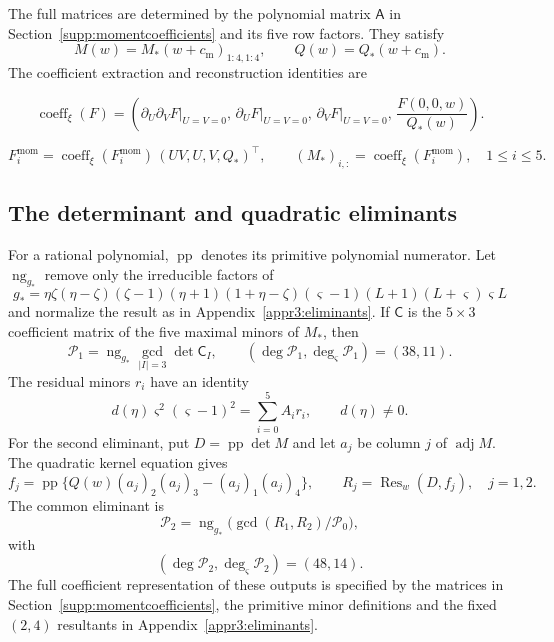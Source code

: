 The full matrices are determined by the polynomial matrix
$\mathsf A$ in Section~\ref{supp:momentcoefficients} and its five
row factors. They satisfy
\[
 M(w)=M_*(w+c_{\mathrm m})_{1:4,1:4},\qquad
 Q(w)=Q_*(w+c_{\mathrm m}).
\]
The coefficient extraction and reconstruction identities are

\begin{equation}\label{supp:r3:momentextraction}
 \operatorname{coeff}_{\xi}(F)=\left(
 \left.\partial_U\partial_VF\right|_{U=V=0},\,
 \left.\partial_UF\right|_{U=V=0},\,
 \left.\partial_VF\right|_{U=V=0},\,
 \frac{F(0,0,w)}{Q_*(w)}\right).
\end{equation}

\begin{equation}\label{supp:r3:momentreconstruction}
 F_i^{\mathrm{mom}}=\operatorname{coeff}_{\xi}(F_i^{\mathrm{mom}})\,(UV,U,V,Q_*)^{\top},
 \qquad (M_*)_{i,:}=\operatorname{coeff}_{\xi}(F_i^{\mathrm{mom}}),\quad 1\le i\le5.
\end{equation}

\subsection{The determinant and quadratic eliminants}

For a rational polynomial, $\operatorname{pp}$ denotes its primitive
polynomial numerator. Let $\operatorname{ng}_{g_*}$ remove only
the irreducible factors of
\[
 g_*=\eta\zeta(\eta-\zeta)(\zeta-1)(\eta+1)(1+\eta-\zeta)
        (\varsigma-1)(L+1)(L+\varsigma)\varsigma L
\]
and normalize the result as in Appendix~\ref{appr3:eliminants}.
If $\mathsf C$ is the $5\times3$ coefficient matrix of the five
maximal minors of $M_*$, then
\[
 \mathcal P_1=\operatorname{ng}_{g_*}
                 \gcd_{|I|=3}\det\mathsf C_I,
 \qquad (\deg\mathcal P_1,\deg_\varsigma\mathcal P_1)=(38,11).
\]
The residual minors $r_i$ have an identity
\[
 d(\eta)\varsigma^2(\varsigma-1)^2=\sum_{i=0}^5 A_ir_i,
 \qquad d(\eta)\ne0.
\]
For the second eliminant, put $D=\operatorname{pp}\det M$ and let
$a_j$ be column $j$ of $\operatorname{adj}M$. The quadratic kernel
equation gives
\[
 f_j=\operatorname{pp}\{Q(w)(a_j)_2(a_j)_3-(a_j)_1(a_j)_4\},
 \qquad R_j=\operatorname{Res}_w(D,f_j),\quad j=1,2.
\]
The common eliminant is
\[
 \mathcal P_2=\operatorname{ng}_{g_*}
       \bigl(\gcd(R_1,R_2)/\mathcal P_0\bigr),
\]
with
\[
 (\deg\mathcal P_2,\deg_\varsigma\mathcal P_2)=(48,14).
\]
The full coefficient representation of these outputs is specified by
the matrices in Section~\ref{supp:momentcoefficients}, the primitive
minor definitions and the fixed $(2,4)$ resultants in
Appendix~\ref{appr3:eliminants}.

